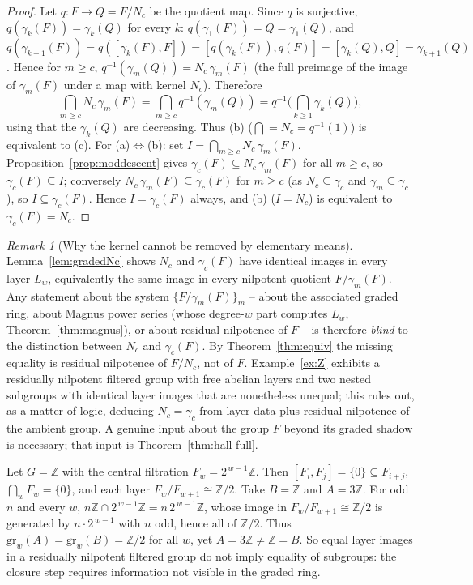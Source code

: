 \documentclass{amsart}
\theoremstyle{definition}
\theoremstyle{remark}
\newtheorem{remark}{Remark}
\begin{document}
\begin{proof}
Let $q\colon F\to Q=F/N_c$ be the quotient map. Since $q$ is surjective,
$q(\gamma_k(F))=\gamma_k(Q)$ for every $k$: $q(\gamma_1(F))=Q=\gamma_1(Q)$, and
$q(\gamma_{k+1}(F))=q([\gamma_k(F),F])=[q(\gamma_k(F)),q(F)]
=[\gamma_k(Q),Q]=\gamma_{k+1}(Q)$. Hence for $m\ge c$,
$q^{-1}(\gamma_m(Q))=N_c\,\gamma_m(F)$ (the full preimage of the image of
$\gamma_m(F)$ under a map with kernel $N_c$). Therefore
\[
\bigcap_{m\ge c} N_c\,\gamma_m(F)=\bigcap_{m\ge c} q^{-1}(\gamma_m(Q))
=q^{-1}\!\Big(\bigcap_{k\ge1}\gamma_k(Q)\Big),
\]
using that the $\gamma_k(Q)$ are decreasing. Thus (b) ($\bigcap=N_c=q^{-1}(1)$) is
equivalent to (c). For (a)$\Leftrightarrow$(b): set $I=\bigcap_{m\ge
c}N_c\,\gamma_m(F)$. Proposition~\ref{prop:moddescent} gives
$\gamma_c(F)\subseteq N_c\,\gamma_m(F)$ for all $m\ge c$, so
$\gamma_c(F)\subseteq I$; conversely $N_c\,\gamma_m(F)\subseteq\gamma_c(F)$ for
$m\ge c$ (as $N_c\subseteq\gamma_c$ and $\gamma_m\subseteq\gamma_c$), so
$I\subseteq\gamma_c(F)$. Hence $I=\gamma_c(F)$ always, and (b) ($I=N_c$) is
equivalent to $\gamma_c(F)=N_c$.
\end{proof}

\begin{remark}[Why the kernel cannot be removed by elementary means]
\label{rem:graded-insufficient}
Lemma~\ref{lem:gradedNc} shows $N_c$ and $\gamma_c(F)$ have identical images in
every layer $L_w$, equivalently the same image in every nilpotent quotient
$F/\gamma_m(F)$. Any statement about the system $\{F/\gamma_m(F)\}_m$ -- about the
associated graded ring, about Magnus power series (whose degree-$w$ part computes
$L_w$, Theorem~\ref{thm:magnus}), or about residual nilpotence of $F$ -- is
therefore \emph{blind} to the distinction between $N_c$ and $\gamma_c(F)$. By
Theorem~\ref{thm:equiv} the missing equality is residual nilpotence of $F/N_c$,
not of $F$. Example~\ref{ex:Z} exhibits a residually nilpotent filtered group with
free abelian layers and two nested subgroups with identical layer images that are
nonetheless unequal; this rules out, as a matter of logic, deducing $N_c=\gamma_c$
from layer data plus residual nilpotence of the ambient group. A genuine input
about the group $F$ beyond its graded shadow is necessary; that input is
Theorem~\ref{thm:hall-full}.
\end{remark}

\begin{example}\label{ex:Z}
Let $G=\mathbb Z$ with the central filtration $F_w=2^{\,w-1}\mathbb Z$. Then
$[F_i,F_j]=\{0\}\subseteq F_{i+j}$, $\bigcap_w F_w=\{0\}$, and each layer
$F_w/F_{w+1}\cong\mathbb Z/2$. Take $B=\mathbb Z$ and $A=3\mathbb Z$. For odd $n$
and every $w$, $n\mathbb Z\cap2^{\,w-1}\mathbb Z=n\,2^{\,w-1}\mathbb Z$, whose
image in $F_w/F_{w+1}\cong\mathbb Z/2$ is generated by $n\cdot2^{\,w-1}$ with $n$
odd, hence all of $\mathbb Z/2$. Thus $\mathrm{gr}_w(A)=\mathrm{gr}_w(B)=\mathbb
Z/2$ for all $w$, yet $A=3\mathbb Z\ne\mathbb Z=B$. So equal layer images in a
residually nilpotent filtered group do not imply equality of subgroups: the closure
step requires information not visible in the graded ring.
\end{example}
\end{document}
